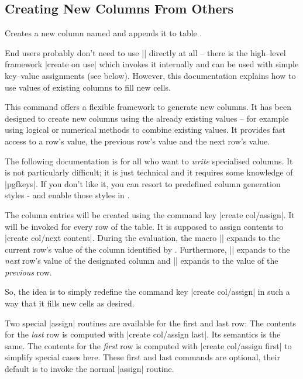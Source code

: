 \subsection{Creating New Columns From Others}
\begin{command}{\pgfplotstablecreatecol{}}
Creates a new column named  and appends it to table .

End users probably don't need to use |\pgfplotstablecreatecol| directly at all -- there is the high--level framework |create on use| which invokes it internally and can be used with simple key--value assignments (see below). However, this documentation explains how to use values of existing columns to fill new cells.

This command offers a flexible framework to generate new columns. It has been designed to create new columns using the already existing values -- for example using logical or numerical methods to combine existing values. It provides fast access to a row's value, the previous row's value and the next row's value.

The following documentation is for all who want to \emph{write} specialised columns. It is not particularly difficult; it is just technical and it requires some knowledge of |pgfkeys|. If you don't like it, you can resort to predefined column generation styles - and enable those styles in .

The column entries will be created using the command key |create col/assign|. It will be invoked for every row of the table.
It is supposed to assign contents to |create col/next content|.
During the evaluation, the macro |\thisrow| 
expands to the current row's value of the column identified by .
Furthermore, |\nextrow| expands to the \emph{next} row's
value of the designated column and |\prevrow| expands to the value of the \emph{previous} row.

So, the idea is to simply redefine the command key |create col/assign| in such a way that it fills new cells as desired.

Two special |assign| routines are available for the first and last row: The contents for the \emph{last} row is computed with |create col/assign last|. Its semantics is the same. The contents for the \emph{first} row is computed with |create col/assign first| to simplify special cases here. These first and last commands are optional, their default is to invoke the normal |assign| routine.


\end{command}
